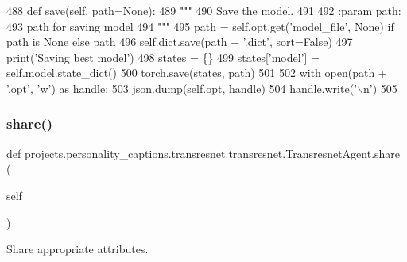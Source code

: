 \begin{DoxyCode}
488     \textcolor{keyword}{def }save(self, path=None):
489         \textcolor{stringliteral}{"""}
490 \textcolor{stringliteral}{        Save the model.}
491 \textcolor{stringliteral}{}
492 \textcolor{stringliteral}{        :param path:}
493 \textcolor{stringliteral}{            path for saving model}
494 \textcolor{stringliteral}{        """}
495         path = self.opt.get(\textcolor{stringliteral}{'model\_file'}, \textcolor{keywordtype}{None}) \textcolor{keywordflow}{if} path \textcolor{keywordflow}{is} \textcolor{keywordtype}{None} \textcolor{keywordflow}{else} path
496         self.dict.save(path + \textcolor{stringliteral}{'.dict'}, sort=\textcolor{keyword}{False})
497         print(\textcolor{stringliteral}{'Saving best model'})
498         states = \{\}
499         states[\textcolor{stringliteral}{'model'}] = self.model.state\_dict()
500         torch.save(states, path)
501 
502         with open(path + \textcolor{stringliteral}{'.opt'}, \textcolor{stringliteral}{'w'}) \textcolor{keyword}{as} handle:
503             json.dump(self.opt, handle)
504             handle.write(\textcolor{stringliteral}{'\(\backslash\)n'})
505 
\end{DoxyCode}
\mbox{\label{classprojects_1_1personality__captions_1_1transresnet_1_1transresnet_1_1TransresnetAgent_a3d5bcfdf1b547e56c6e6e1af047fa7c2}} 
\subsubsection{\texorpdfstring{share()}{share()}}
{\footnotesize\ttfamily def projects.\+personality\+\_\+captions.\+transresnet.\+transresnet.\+Transresnet\+Agent.\+share (\begin{DoxyParamCaption}\item[{}]{self }\end{DoxyParamCaption})}

\begin{DoxyVerb}Share appropriate attributes.
\end{DoxyVerb}
 

